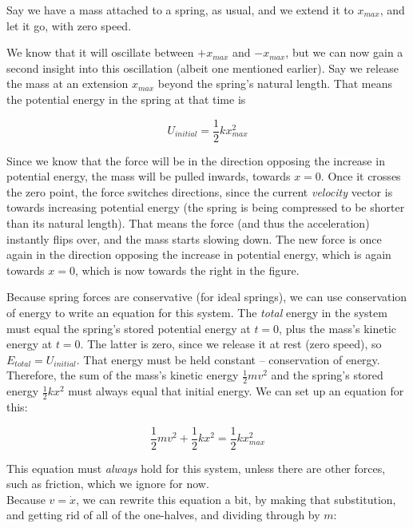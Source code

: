 Say we have a mass attached to a spring, as usual, and we extend it to $x_{max}$, and let it go, with zero speed.

We know that it will oscillate between $+x_{max}$ and $-x_{max}$, but we can now gain a second insight into this oscillation (albeit one mentioned earlier). Say we release the mass at an extension $x_{max}$ beyond the spring's natural length. That means the potential energy in the spring at that time is

\begin{equation}
U_{initial} = \frac{1}{2} k x_{max}^2
\end{equation}

Since we know that the force will be in the direction opposing the increase in potential energy, the mass will be pulled inwards, towards $x = 0$. Once it crosses the zero point, the force switches directions, since the current \emph{velocity} vector is towards increasing potential energy (the spring is being compressed to be shorter than its natural length). That means the force (and thus the acceleration) instantly flips over, and the mass starts slowing down. The new force is once again in the direction opposing the increase in potential energy, which is again towards $x = 0$, which is now towards the right in the figure.

Because spring forces are conservative (for ideal springs), we can use conservation of energy to write an equation for this system. The \emph{total} energy in the system must equal the spring's stored potential energy at $t = 0$, plus the mass's kinetic energy at $t = 0$. The latter is zero, since we release it at rest (zero speed), so $E_{total} = U_{initial}$. That energy must be held constant -- conservation of energy. Therefore, the sum of the mass's kinetic energy $\displaystyle \frac{1}{2} m v^2$ and the spring's stored energy $\displaystyle \frac{1}{2} k x^2$ must always equal that initial energy. We can set up an equation for this:

\begin{equation}
\frac{1}{2} m v^2 + \frac{1}{2} k x^2 = \frac{1}{2} k x_{max}^2
\end{equation}

This equation must \emph{always} hold for this system, unless there are other forces, such as friction, which we ignore for now.\\
Because $v = \dot{x}$, we can rewrite this equation a bit, by making that substitution, and getting rid of all of the one-halves, and dividing through by $m$:

